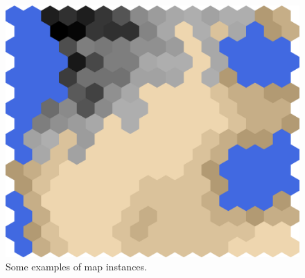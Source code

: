 \documentclass[conference]{IEEEtran}
\theoremstyle{definition}
\begin{document}
\begin{figure}
\begin{minipage}{.19\textwidth}
		\includegraphics[width=\textwidth]{tf-j}
	\end{minipage}
	\label{fig:mapsss}
	\caption{Some examples of map instances.}
\end{figure}
\end{document}
